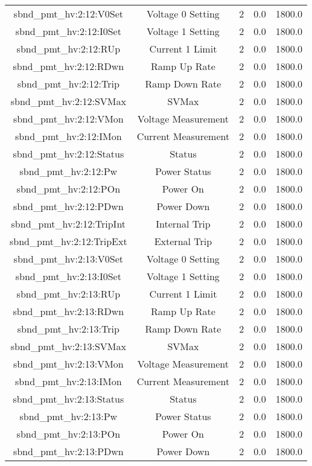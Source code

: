 \begin{center}
\begin{longtable}{c | c c c c }
sbnd\_pmt\_hv:2:12:V0Set & Voltage 0 Setting & 2 & 0.0 & 1800.0\\ 
sbnd\_pmt\_hv:2:12:I0Set & Voltage 1 Setting & 2 & 0.0 & 1800.0\\ 
sbnd\_pmt\_hv:2:12:RUp & Current 1 Limit & 2 & 0.0 & 1800.0\\ 
sbnd\_pmt\_hv:2:12:RDwn & Ramp Up Rate & 2 & 0.0 & 1800.0\\ 
sbnd\_pmt\_hv:2:12:Trip & Ramp Down Rate & 2 & 0.0 & 1800.0\\ 
sbnd\_pmt\_hv:2:12:SVMax & SVMax & 2 & 0.0 & 1800.0\\ 
sbnd\_pmt\_hv:2:12:VMon & Voltage Measurement & 2 & 0.0 & 1800.0\\ 
sbnd\_pmt\_hv:2:12:IMon & Current Measurement & 2 & 0.0 & 1800.0\\ 
sbnd\_pmt\_hv:2:12:Status & Status & 2 & 0.0 & 1800.0\\ 
sbnd\_pmt\_hv:2:12:Pw & Power Status & 2 & 0.0 & 1800.0\\ 
sbnd\_pmt\_hv:2:12:POn & Power On & 2 & 0.0 & 1800.0\\ 
sbnd\_pmt\_hv:2:12:PDwn & Power Down & 2 & 0.0 & 1800.0\\ 
sbnd\_pmt\_hv:2:12:TripInt & Internal Trip & 2 & 0.0 & 1800.0\\ 
sbnd\_pmt\_hv:2:12:TripExt & External Trip & 2 & 0.0 & 1800.0\\ 
sbnd\_pmt\_hv:2:13:V0Set & Voltage 0 Setting & 2 & 0.0 & 1800.0\\ 
sbnd\_pmt\_hv:2:13:I0Set & Voltage 1 Setting & 2 & 0.0 & 1800.0\\ 
sbnd\_pmt\_hv:2:13:RUp & Current 1 Limit & 2 & 0.0 & 1800.0\\ 
sbnd\_pmt\_hv:2:13:RDwn & Ramp Up Rate & 2 & 0.0 & 1800.0\\ 
sbnd\_pmt\_hv:2:13:Trip & Ramp Down Rate & 2 & 0.0 & 1800.0\\ 
sbnd\_pmt\_hv:2:13:SVMax & SVMax & 2 & 0.0 & 1800.0\\ 
sbnd\_pmt\_hv:2:13:VMon & Voltage Measurement & 2 & 0.0 & 1800.0\\ 
sbnd\_pmt\_hv:2:13:IMon & Current Measurement & 2 & 0.0 & 1800.0\\ 
sbnd\_pmt\_hv:2:13:Status & Status & 2 & 0.0 & 1800.0\\ 
sbnd\_pmt\_hv:2:13:Pw & Power Status & 2 & 0.0 & 1800.0\\ 
sbnd\_pmt\_hv:2:13:POn & Power On & 2 & 0.0 & 1800.0\\ 
sbnd\_pmt\_hv:2:13:PDwn & Power Down & 2 & 0.0 & 1800.0\\ 

\end{longtable}
\end{center}
